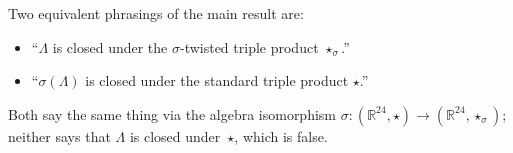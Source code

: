 \documentclass[11pt]{amsart}
\newcommand{\LL}{\Lambda}
\newcommand{\RR}{\mathbb{R}}
\begin{document}
\noindent Two equivalent phrasings of the main result are:
\begin{itemize}
\item ``$\LL$ is closed under the $\sigma$-twisted triple product
  $\star_\sigma$.''
\item ``$\sigma(\LL)$ is closed under the standard triple product
  $\star$.''
\end{itemize}
Both say the same thing via the algebra isomorphism
$\sigma: (\RR^{24}, \star) \to (\RR^{24}, \star_\sigma)$; neither
says that $\LL$ is closed under~$\star$, which is false.

\end{document}
